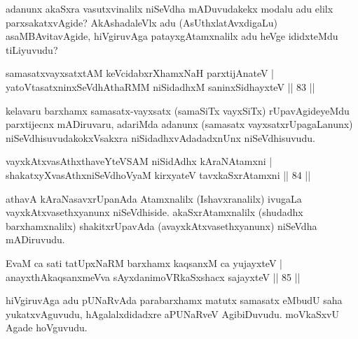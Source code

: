 \begin{artha}
adanunx akaSxra vasutxvinalilx niSeVdha mADuvudakekx modalu adu elilx parxsakatxvAgide? AkAshadaleVlx adu (AsUthxlatAvxdigaLu) asaMBAvitavAgide, hiVgiruvAga patayxgAtamxnalilx adu heVge ididxteMdu tiLiyuvudu?
\end{artha}


\begin{shl}
samasatxvayxsatxtAM keVcidabxrXhamxNaH parxtijAnateV |\\
yatoV\s tasatxninxSeVdhAthaRMM niSidadhxM saninxSidhayxteV \hfill || 83 ||
\end{shl}

\begin{artha}
kelavaru barxhamx samasatx-vayxsatx (samaSiTx vayxSiTx) rUpavAgideyeMdu parxtijecnx mADiruvaru, adariMda adanunx (samasatx vayxsatxrUpagaLanunx) niSeVdhisuvudakokxVsakxra niSidadhxvAdadadxnUnx niSeVdhisuvudu.
\end{artha}

\begin{shl}
vayxkAtxvasAthx\s thaveYteVSAM niSidAdhx kAraNAtamxni |\\
shakatxyXvasAthxniSeVdhoV\s yaM kirxyateV tavxkaSxrAtamxni \hfill || 84 ||
\end{shl}

\begin{artha}
athavA kAraNasavxrUpanAda Atamxnalilx (Ishavxranalilx) ivugaLa vayxkAtxvasethxyanunx niSeVdhiside. akaSxrAtamxnalilx (shudadhx barxhamxnalilx) shakitxrUpavAda (avayxkAtxvasethxyanunx) niSeVdha mADiruvudu.
\end{artha}


\begin{shl}
EvaM ca sati tatUpxNaRM barxhamx kaqsanxM ca yujayxteV |\\
anayxthA\s kaqsanxmeVva sAyxdanimoVRkaSxshacx sajayxteV \hfill || 85 ||
\end{shl}

\begin{artha}
hiVgiruvAga adu pUNaRvAda parabarxhamx matutx samasatx eMbudU saha yukatxvAguvudu, hAgalalxdidadxre aPUNaRveV AgibiDuvudu. moVkaSxvU Agade hoVguvudu. 
\end{artha}


